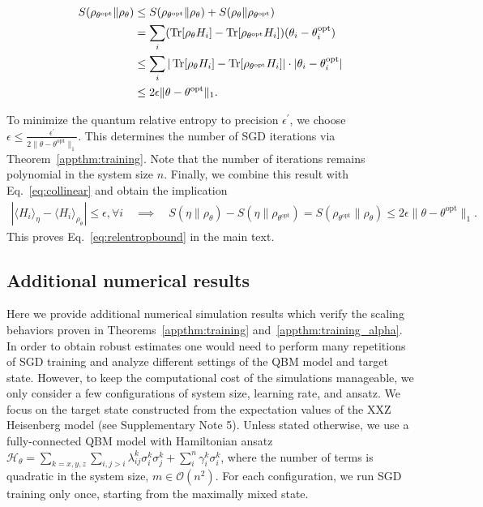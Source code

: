 \documentclass[
    reprint,
    aps,
    prx,
    longbibliography
]{revtex4-2}
\begin{document}
\begin{align}
\begin{split}
\label{eq:up_bound_for_S}
S(\rho_{\theta^\mathrm{opt}} \| \rho_\theta) &\leq S(\rho_{\theta^\mathrm{opt}} \| \rho_\theta) + S(\rho_{\theta} \| \rho_{\theta^\mathrm{opt}}) \\
&= \sum_i ( \Tr[\rho_{\theta} H_i] - \Tr[\rho_{\theta^\mathrm{opt}} H_i] ) ( \theta_i - \theta^\textrm{opt}_i) \\
&\leq \sum_i | \Tr[\rho_{\theta} H_i] - \Tr[\rho_{\theta^\mathrm{opt}} H_i] | \cdot | \theta_i - \theta^\textrm{opt}_i | \\
&\leq 2 \epsilon \| \theta - \theta^\textrm{opt} \|_1 .
\end{split}
\end{align}

To minimize the quantum relative entropy to precision $\epsilon^\prime$, we choose $\epsilon \leq \frac{\epsilon^\prime}{ 2 \| \theta - \theta^\textrm{opt} \|_1 }$. This determines the number of SGD iterations via Theorem~\ref{appthm:training}. Note that the number of iterations remains polynomial in the system size $n$. Finally, we combine this result with Eq.~\eqref{eq:collinear} and obtain the implication
\begin{align}
\label{eq:app_relentropbound}
    |\langle H_{i}\rangle_\eta -\langle H_{i} \rangle_{\rho_\theta} | \leq \epsilon, \forall i \quad \implies \quad S(\eta \| \rho_{\theta}) - S(\eta \| \rho_{\theta^\mathrm{opt}}) = S(\rho_{\theta^\mathrm{opt}} \| \rho_{\theta}) \leq 2 \epsilon \| \theta - \theta^\textrm{opt} \|_1 .
\end{align} 
This proves Eq.~\eqref{eq:relentropbound} in the main text. 

\subsection*{Additional numerical results}

Here we provide additional numerical simulation results which verify the scaling behaviors proven in Theorems~\ref{appthm:training} and~\ref{appthm:training_alpha}. In order to obtain robust estimates one would need to perform many repetitions of SGD training and analyze different settings of the QBM model and target state. However, to keep the computational cost of the simulations manageable, we only consider a few configurations of system size, learning rate, and ansatz. We focus on the target state constructed from the expectation values of the XXZ Heisenberg model (see Supplementary Note 5).
Unless stated otherwise, we use a fully-connected QBM model with Hamiltonian ansatz $\mathcal{H}_\theta = \sum_{k=x,y,z}\sum_{i, j>i}\lambda^k_{ij}\sigma_i^k\sigma^k_j + \sum_i^n \gamma^k_i\sigma^k_i$, where the number of terms is quadratic in the system size, $m \in \mathcal{O}(n^2)$. For each configuration, we run SGD training only once, starting from the maximally mixed state.
\end{document}
